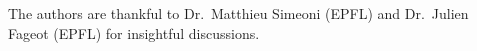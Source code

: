\begin{ack}


The authors are thankful to Dr.\ Matthieu Simeoni (EPFL) and Dr.\ Julien Fageot (EPFL) for insightful discussions.

\end{ack}
